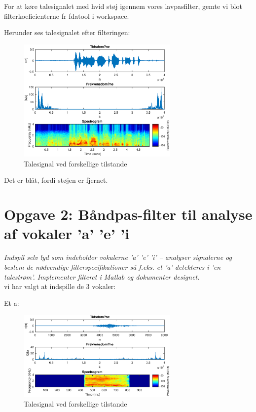 \documentclass[a4paper]{report}
\begin{document}
For at køre talesignalet med hvid støj igennem vores lavpasfilter, gemte vi blot filterkoeficienterne fr fdatool i workspace. 

Herunder ses talesignalet efter filteringen: 

\begin{figure}[H] 
\centering
\includegraphics[width=0.7\textwidth]{grafer/opg1_filter}
\caption{Talesignal ved forskellige tilstande} \label{opg1_filter}
\end{figure}


Det er blåt, fordi støjen er fjernet.


\section*{Opgave 2: Båndpas-filter til analyse af vokaler ’a’  ’e’  ’i}
\textit{Indspil selv lyd som indeholder vokalerne ’a’  ’e’  ’i’ – analyser signalerne og bestem de nødvendige filterspecifikationer så f.eks. et ’a’ detekteres i ’en talestrøm’. Implementer filteret i Matlab og dokumenter designet.}\\


vi har valgt at indspille de 3 vokaler: 

Et a: 

\begin{figure}[H] 
\centering
\includegraphics[width=0.7\textwidth]{grafer/opg2_a}
\caption{Talesignal ved forskellige tilstande} \label{opg2_a}
\end{figure}
\end{document}

